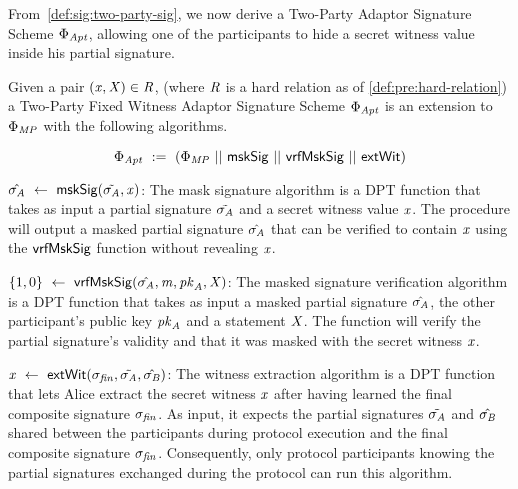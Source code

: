 From~\cref{def:sig:two-party-sig}, we now derive a Two-Party Adaptor Signature Scheme $\Phi_{\mathit{Apt}}$, allowing one of the participants to hide a secret witness value inside his partial signature.
\begin{definition}
    \label{def:sig:two-party-fixed-wit-apt-sig}
    Given a pair $(\mathit{x}, \mathit{X}) \in \mathit{R}$, (where $\mathit{R}$ is a hard relation as of \cref{def:pre:hard-relation}) a Two-Party Fixed Witness Adaptor Signature Scheme $\Phi_{\mathit{Apt}}$ is an extension to $\Phi_{\mathit{MP}}$ with the following algorithms.

    \[ \Phi_{\mathit{Apt}} ~:=~ (\Phi_{\mathit{MP}} ~||~ \mathsf{mskSig} ~||~ \mathsf{vrfMskSig} ~||~ \mathsf{extWit}) \]

    \begin{asparaitem}
        \item $\hat{\sigma_{\mathit{A}}} ~\leftarrow~ \mathsf{mskSig}(\tilde{\sigma_{\mathit{A}}}, \mathit{x})$: The mask signature algorithm is a DPT function that takes as input a partial signature $\tilde{\sigma_{\mathit{A}}}$ and a secret witness value $\mathit{x}$.
        The procedure will output a masked partial signature $\hat{\sigma_{\mathit{A}}}$ that can be verified to contain $\mathit{x}$ using the $\mathsf{vrfMskSig}$ function without revealing $\mathit{x}$.

        \item $\{1,0\} ~\leftarrow~ \mathsf{vrfMskSig}(\hat{\sigma_{\mathit{A}}},\mathit{m},\mathit{pk}_{\mathit{A}},\mathit{X})$: The masked signature verification algorithm is a DPT function that takes as input a masked partial signature $\hat{\sigma_{\mathit{A}}}$, the other participant's public key $\mathit{pk}_{\mathit{A}}$ and a statement $\mathit{X}$.
        The function will verify the partial signature's validity and that it was masked with the secret witness $\mathit{x}$.

        \item $\mathit{x} ~\leftarrow~ \mathsf{extWit}(\sigma_{\mathit{fin}}, \tilde{\sigma_{\mathit{A}}}, \hat{\sigma_{\mathit{B}}})$: The witness extraction algorithm is a DPT function that lets Alice extract the secret witness $\mathit{x}$ after having learned the final composite signature $\sigma_{\mathit{fin}}$.
        As input, it expects the partial signatures $\tilde{\sigma_{\mathit{A}}}$ and $\hat{\sigma_{\mathit{B}}}$ shared between the participants during protocol execution and the final composite signature $\sigma_{\mathit{fin}}$.
        Consequently, only protocol participants knowing the partial signatures exchanged during the protocol can run this algorithm.
    \end{asparaitem}
\end{definition}

